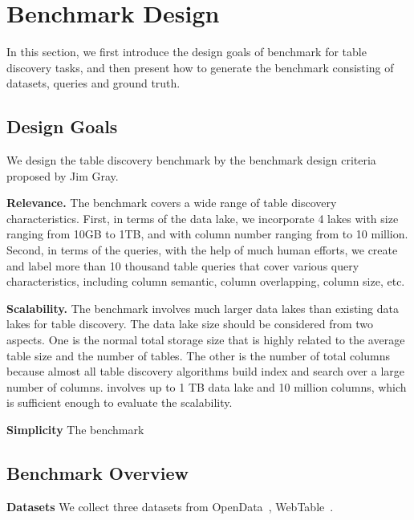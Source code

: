 \section{Benchmark Design} 
In this section, we first introduce the design goals of \sys benchmark for table discovery tasks, and then present how to generate the \sys benchmark consisting of datasets, queries and ground truth.

\subsection{Design Goals}
We design the table discovery benchmark by the 
benchmark design criteria proposed by Jim Gray.

\noindent\textbf{Relevance.}
The benchmark covers a wide range of table discovery characteristics. First, in terms of the data lake, we incorporate 4 lakes with size ranging from 10GB to 1TB, and with column number ranging from  to 10 million. Second, in terms of the queries, with the help of much human efforts, we create and label more than 10 thousand table queries that cover various query characteristics, including column semantic, column overlapping, column size, etc.



\noindent\textbf{Scalability.} The benchmark involves much larger data lakes than existing data lakes for table discovery. The data lake size should be considered from two aspects. One is the normal total storage size that is highly related  to the average table size  and the number of tables. The other is the number of total columns because almost all table discovery algorithms build index and search over a large number of columns.  \sys involves up to 1 TB data lake and 10 million columns, which is sufficient enough to evaluate the scalability.




\noindent\textbf{Simplicity} The benchmark 









\subsection{Benchmark Overview}


\noindent\textbf{Datasets}
We collect three datasets from OpenData~\cite{OpenData}, WebTable~\cite{WebTable}. 


